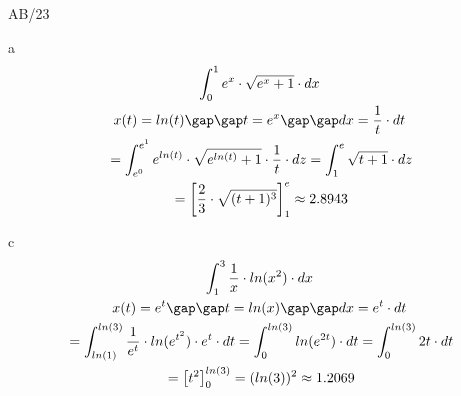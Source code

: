 \begin{exercise}{AB/23}
  \item [a]
  \begin{gather*}
    \int_0^1 e^x \cdot \sqrt{e^x + 1} \cdot dx \\
    x(t) = ln(t) \gap\gap t = e^x \gap\gap dx = \frac{1}{t} \cdot dt \\
    \;= \int_{e^0}^{e^1} e^{ln(t)} \cdot \sqrt{e^{ln(t)} + 1} \cdot \frac{1}{t} \cdot dz = \int_1^e \sqrt{t + 1} \cdot dz \\
    \;= \left[\frac{2}{3} \cdot \sqrt{(t + 1)^3}\right]_1^e \approx 2.8943
  \end{gather*}
  \item [c]
  \begin{gather*}
    \int_1^3 \frac{1}{x} \cdot ln(x^2) \cdot dx \\
    x(t) = e^t \gap\gap t = ln(x) \gap\gap dx = e^t \cdot dt \\
    \;= \int_{ln(1)}^{ln(3)} \frac{1}{e^t} \cdot ln(e^{t^2}) \cdot e^t \cdot dt = \int_0^{ln(3)} ln(e^{2t}) \cdot dt = \int_0^{ln(3)} 2t \cdot dt \\
    \;= \left[t^2\right]_0^{ln(3)} = (ln(3))^2 \approx 1.2069
  \end{gather*}
\end{exercise}
